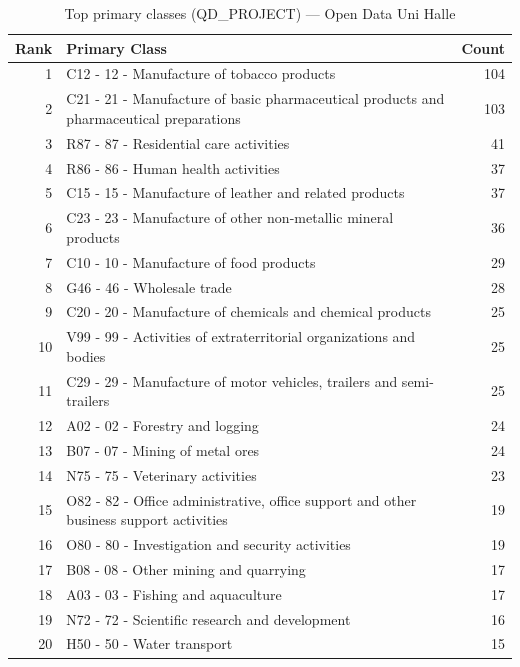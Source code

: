 \begin{table}[H]
    \centering
    \begin{tabular}{r p{10cm} r}
    \hline
    \textbf{Rank} & \textbf{Primary Class} & \textbf{Count} \\
    \hline
    1 & C12 - 12 - Manufacture of tobacco products & 104 \\
    2 & C21 - 21 - Manufacture of basic pharmaceutical products and pharmaceutical preparations & 103 \\
    3 & R87 - 87 - Residential care activities & 41 \\
    4 & R86 - 86 - Human health activities & 37 \\
    5 & C15 - 15 - Manufacture of leather and related products & 37 \\
    6 & C23 - 23 - Manufacture of other non-metallic mineral products & 36 \\
    7 & C10 - 10 - Manufacture of food products & 29 \\
    8 & G46 - 46 - Wholesale trade & 28 \\
    9 & C20 - 20 - Manufacture of chemicals and chemical products & 25 \\
    10 & V99 - 99 - Activities of extraterritorial organizations and bodies & 25 \\
    11 & C29 - 29 - Manufacture of motor vehicles, trailers and semi-trailers & 25 \\
    12 & A02 - 02 - Forestry and logging & 24 \\
    13 & B07 - 07 - Mining of metal ores & 24 \\
    14 & N75 - 75 - Veterinary activities & 23 \\
    15 & O82 - 82 - Office administrative, office support and other business support activities & 19 \\
    16 & O80 - 80 - Investigation and security activities & 19 \\
    17 & B08 - 08 - Other mining and quarrying & 17 \\
    18 & A03 - 03 - Fishing and aquaculture & 17 \\
    19 & N72 - 72 - Scientific research and development & 16 \\
    20 & H50 - 50 - Water transport & 15 \\
    \hline
    \end{tabular}
    \caption{Top primary classes (QD\_PROJECT) --- Open Data Uni Halle}
\end{table}

